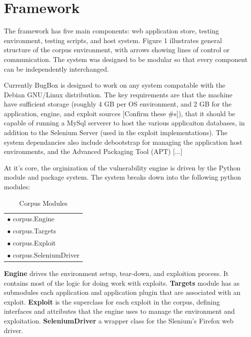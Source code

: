 \documentclass[letterpaper,twocolumn,10pt]{article}
\begin{document}
\section{Framework}

The framework has five main components: web application store, testing environment, testing scripts, and host system. Figure 1 illustrates general structure of the corpus environment, with arrows showing lines of control or communication. The system was designed to be modular so that every component can be independently interchanged.\par
Currently BugBox is designed to work on any system compatable with the Debian GNU/Linux distribution. The key requirements are that the machine have sufficient storage (roughly 4 GB per OS environment, and 2 GB for the application, engine, and exploit sources [Confirm these #s]), that it should be capable of running a MySql serverer to host the various applicaiton databases, in addition to the Selenium Server (used in the exploit implementations). The system dependancies also include debootstrap for managing the application host environments, and the Advanced Packaging Tool (APT) [...]
   
At it's core, the orginization of the vulnerability engine is driven by the Python module and package system. The system breaks down into the following python modules:

 \begin{table}
 \begin{minipage}[b]{0.45\linewidth}
 \caption{Corpus Modules}
 \hline
 \begin{tabular}{ l }
   $\bullet$ corpus.Engine\\
   $\bullet$ corpus.Targets\\
   $\bullet$ corpus.Exploit\\
   $\bullet$ corpus.SeleniumDriver\\
 \end{tabular}
\end{minipage}
\end{table}


   {\bf Engine} drives the environment setup, tear-down, and exploition process. It contains most of the logic for doing work with exploits.
   {\bf Targets} module has as submodules each application and application plugin that are associated with an exploit.
   {\bf Exploit} is the superclass for each exploit in the corpus, defining interfaces and attributes that the engine uses to manage the environment and exploitation.
   {\bf SeleniumDriver} a wrapper class for the Slenium's Firefox web driver.
\end{document}
